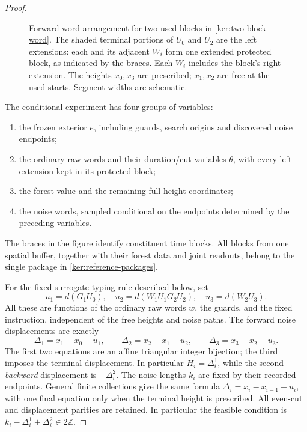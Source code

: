 \documentclass[11pt]{article}
\numberwithin{equation}{section}
\theoremstyle{definition}
\theoremstyle{remark}
\newcommand{\Z}{\mathbb Z}
\newcommand{\1}{\mathbf 1}
\begin{document}
\begin{proof}
\begin{figure}[htbp]

\caption{Forward word arrangement for two used blocks in
\eqref{ker:two-block-word}.  The shaded terminal portions of \(U_0\)
and \(U_2\) are the left extensions: each and its adjacent \(W_i\)
form one extended protected block, as indicated by the braces.
Each \(W_i\) includes the block's right extension.
The heights \(x_0,x_3\) are prescribed; \(x_1,x_2\) are free at the
used starts.  Segment widths are schematic.}
\label{ker:word-arrangement-figure}
\end{figure}

The conditional experiment has four groups of variables:
\begin{enumerate}[label=(\roman*)]
\item the frozen exterior \(e\), including guards, search origins and
      discovered noise endpoints;
\item the ordinary raw words and their duration/cut variables \(\theta\),
      with every left extension kept in its protected block;
\item the forest value and the remaining full-height coordinates;
\item the noise words, sampled conditional on the endpoints determined
      by the preceding variables.
\end{enumerate}
The braces in the figure identify constituent time blocks. All blocks
from one spatial buffer, together with their forest data and joint
readouts, belong to the single package in
\eqref{ker:reference-packages}.

For the fixed surrogate typing rule described below, set
\[
 u_1=d(G_1U_0),\quad
 u_2=d(W_1U_1G_2U_2),\quad u_3=d(W_2U_3).
\]
All these are functions of the ordinary raw words \(w\), the guards,
and the fixed instruction, independent of the free heights and
noise paths.  The forward noise displacements are exactly
\begin{equation}\label{ker:triangular-heights}
 \Delta_1=x_1-x_0-u_1,\qquad
 \Delta_2=x_2-x_1-u_2,\qquad
 \Delta_3=x_3-x_2-u_3.
\end{equation}
The first two equations are an affine triangular integer bijection;
the third imposes the terminal displacement.  In particular
\(H_i=\Delta_i^1\), while the second \emph{backward} displacement
is \(-\Delta_i^2\).  The noise lengths \(k_i\) are fixed by their
recorded endpoints.  General finite collections give the same formula
\(\Delta_i=x_i-x_{i-1}-u_i\), with one final equation only when the
terminal height is prescribed.  All even-cut and displacement parities
are retained.  In particular the feasible condition is
\(k_i-\Delta_i^1+\Delta_i^2\in2\Z\).


\end{proof}
\end{document}
